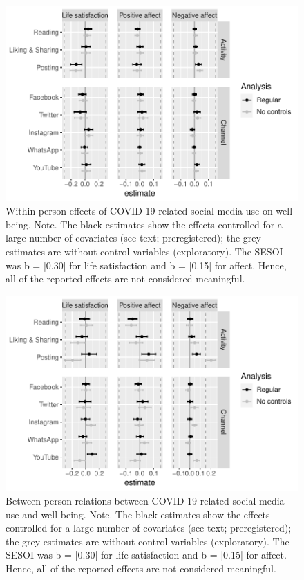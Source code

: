 \documentclass[
  man,mask]{apa7}
\begin{document}
\newpage

\begin{figure}
\includegraphics[width=\textwidth]{manuscript_files/figure-latex/fig-within-1} \caption{Within-person effects of COVID-19 related social media use on well-being. Note. The black estimates show the effects controlled for a large number of covariates (see text; preregistered); the grey estimates are without control variables (exploratory). The SESOI was b = |0.30| for life satisfaction and b = |0.15| for affect. Hence, all of the reported effects are not considered meaningful.}\label{fig:fig-within}
\end{figure}

\newpage

\begin{figure}
\includegraphics[width=\textwidth]{manuscript_files/figure-latex/fig-between-1} \caption{Between-person relations between COVID-19 related social media use and well-being. Note. The black estimates show the effects controlled for a large number of covariates (see text; preregistered); the grey estimates are without control variables (exploratory). The SESOI was b = |0.30| for life satisfaction and b = |0.15| for affect. Hence, all of the reported effects are not considered meaningful.}\label{fig:fig-between}
\end{figure}
\end{document}
